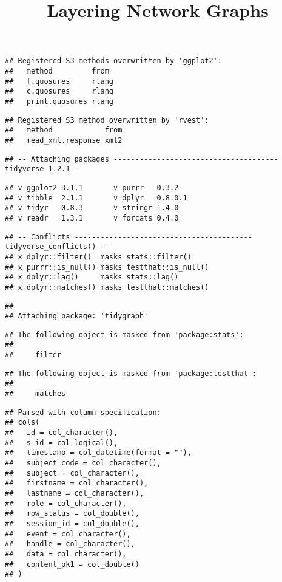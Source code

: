 \documentclass[
  ignorenonframetext,
]{beamer}
\title{Layering Network Graphs}
\date{}
\begin{document}
\frame{\titlepage}

\begin{frame}[fragile]

\begin{verbatim}
## Registered S3 methods overwritten by 'ggplot2':
##   method         from 
##   [.quosures     rlang
##   c.quosures     rlang
##   print.quosures rlang
\end{verbatim}

\begin{verbatim}
## Registered S3 method overwritten by 'rvest':
##   method            from
##   read_xml.response xml2
\end{verbatim}

\begin{verbatim}
## -- Attaching packages -------------------------------------- tidyverse 1.2.1 --
\end{verbatim}

\begin{verbatim}
## v ggplot2 3.1.1       v purrr   0.3.2  
## v tibble  2.1.1       v dplyr   0.8.0.1
## v tidyr   0.8.3       v stringr 1.4.0  
## v readr   1.3.1       v forcats 0.4.0
\end{verbatim}

\begin{verbatim}
## -- Conflicts ----------------------------------------- tidyverse_conflicts() --
## x dplyr::filter()  masks stats::filter()
## x purrr::is_null() masks testthat::is_null()
## x dplyr::lag()     masks stats::lag()
## x dplyr::matches() masks testthat::matches()
\end{verbatim}

\begin{verbatim}
## 
## Attaching package: 'tidygraph'
\end{verbatim}

\begin{verbatim}
## The following object is masked from 'package:stats':
## 
##     filter
\end{verbatim}

\begin{verbatim}
## The following object is masked from 'package:testthat':
## 
##     matches
\end{verbatim}

\begin{verbatim}
## Parsed with column specification:
## cols(
##   id = col_character(),
##   s_id = col_logical(),
##   timestamp = col_datetime(format = ""),
##   subject_code = col_character(),
##   subject = col_character(),
##   firstname = col_character(),
##   lastname = col_character(),
##   role = col_character(),
##   row_status = col_double(),
##   session_id = col_double(),
##   event = col_character(),
##   handle = col_character(),
##   data = col_character(),
##   content_pk1 = col_double()
## )
\end{verbatim}


\end{frame}
\end{document}
